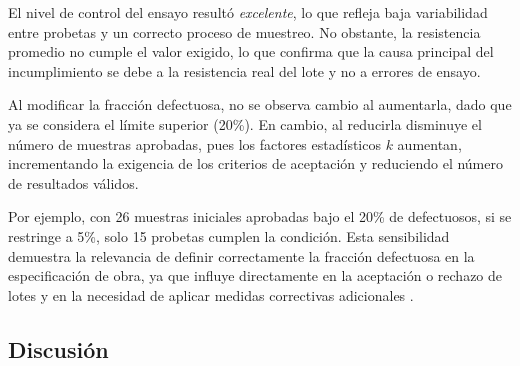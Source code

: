 El nivel de control del ensayo resultó \textit{excelente}, lo que refleja baja variabilidad entre probetas y un correcto proceso de muestreo. No obstante, la resistencia promedio no cumple el valor exigido, lo que confirma que la causa principal del incumplimiento se debe a la resistencia real del lote y no a errores de ensayo.

Al modificar la fracción defectuosa, no se observa cambio al aumentarla, dado que ya se considera el límite superior (20\%). En cambio, al reducirla disminuye el número de muestras aprobadas, pues los factores estadísticos $k$ aumentan, incrementando la exigencia de los criterios de aceptación y reduciendo el número de resultados válidos.

Por ejemplo, con 26 muestras iniciales aprobadas bajo el 20\% de defectuosos, si se restringe a 5\%, solo 15 probetas cumplen la condición. Esta sensibilidad demuestra la relevancia de definir correctamente la fracción defectuosa en la especificación de obra, ya que influye directamente en la aceptación o rechazo de lotes y en la necesidad de aplicar medidas correctivas adicionales \citep{NCh1998}.

\subsection{Discusión}

